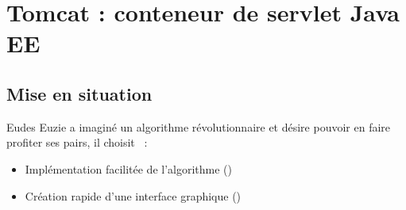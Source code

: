 \section{Tomcat : conteneur de servlet Java EE}

\subsection{Mise en situation}
\begin{frame}
  Eudes Euzie a imaginé un algorithme révolutionnaire et désire pouvoir en faire
  profiter ses pairs, il choisit ~:

  \begin{itemize}
    \item Implémentation facilitée de l'algorithme ()
    \item Création rapide d'une interface graphique ()
  \end{itemize}
\end{frame}
